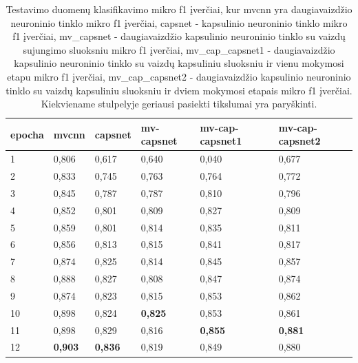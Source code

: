 \begin{table}[]
	\caption{
		Testavimo duomenų klasifikavimo mikro f1 įverčiai, kur mvcnn yra daugiavaizdžio neuroninio tinklo mikro f1 įverčiai, capsnet - kapsulinio neuroninio tinklo mikro f1 įverčiai, mv\_capsnet - daugiavaizdžio kapsulinio neuroninio tinklo su vaizdų sujungimo sluoksniu mikro f1 įverčiai, mv\_cap\_capsnet1 - daugiavaizdžio kapsulinio neuroninio tinklo su vaizdų kapsuliniu sluoksniu ir vienu mokymosi etapu mikro f1 įverčiai, mv\_cap\_capsnet2 - daugiavaizdžio kapsulinio neuroninio tinklo su vaizdų kapsuliniu sluoksniu ir dviem mokymosi etapais mikro f1 įverčiai. Kiekviename stulpelyje geriausi pasiekti tikslumai yra paryškinti.
	}
	\begin{tabular}{l|l|l|l|l|l}
		epocha & mvcnn & capsnet & mv-capsnet & mv-cap-capsnet1 & mv-cap-capsnet2 \\
		\hline
		1 & 0,806 &   0,617 &      0,640 &           0,040 &           0,677 \\
		2 & 0,833 &   0,745 &      0,763 &           0,764 &           0,772 \\
		3 & 0,845 &   0,787 &      0,787 &           0,810 &           0,796 \\
		4 & 0,852 &   0,801 &      0,809 &           0,827 &           0,809 \\
		5 & 0,859 &   0,801 &      0,814 &           0,835 &           0,811 \\
		6 & 0,856 &   0,813 &      0,815 &           0,841 &           0,817 \\
		7 & 0,874 &   0,825 &      0,814 &           0,845 &           0,857 \\
		8 & 0,888 &   0,827 &      0,808 &           0,847 &           0,874 \\
		9 & 0,874 &   0,823 &      0,815 &           0,853 &           0,862 \\
		10 & 0,898 &   0,824 &      \textbf{0,825} &           0,853 &           0,861 \\
		11 & 0,898 &   0,829 &      0,816 &           \textbf{0,855} &           \textbf{0,881} \\
		12 & \textbf{0,903} &   \textbf{0,836} &      0,819 &           0,849 &           0,880 \\
	\end{tabular}
	\label{tbl:micro_f1}
\end{table}

